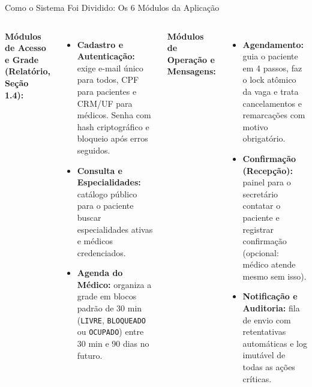 \documentclass[aspectratio=169,t,xcolor=table]{beamer}
\newcommand{\setLayoutClean}{%
    \usebackgroundtemplate{}%
    \setDefaultConfig%
}
\begin{document}
\setLayoutClean
\begin{frame}{Como o Sistema Foi Dividido: Os 6 Módulos da Aplicação}
    \begin{columns}[T]
        \textbf{Módulos de Acesso e Grade (Relatório, Seção 1.4):}
        {\footnotesize
        \begin{itemize}\setlength{\itemsep}{2.5pt}
            \item \textbf{Cadastro e Autenticação:} exige e-mail único para todos, CPF para pacientes e CRM/UF para médicos. Senha com hash criptográfico e bloqueio após erros seguidos.
            \item \textbf{Consulta e Especialidades:} catálogo público para o paciente buscar especialidades ativas e médicos credenciados.
            \item \textbf{Agenda do Médico:} organiza a grade em blocos padrão de 30 min (\texttt{LIVRE}, \texttt{BLOQUEADO} ou \texttt{OCUPADO}) entre 30 min e 90 dias no futuro.
        \end{itemize}
        }

        \textbf{Módulos de Operação e Mensagens:}
        {\footnotesize
        \begin{itemize}\setlength{\itemsep}{2.5pt}
            \item \textbf{Agendamento:} guia o paciente em 4 passos, faz o lock atômico da vaga e trata cancelamentos e remarcações com motivo obrigatório.
            \item \textbf{Confirmação (Recepção):} painel para o secretário contatar o paciente e registrar confirmação (opcional: médico atende mesmo sem isso).
            \item \textbf{Notificação e Auditoria:} fila de envio com retentativas automáticas e log imutável de todas as ações críticas.
        \end{itemize}
        }
    \end{columns}
\end{frame}
\end{document}
